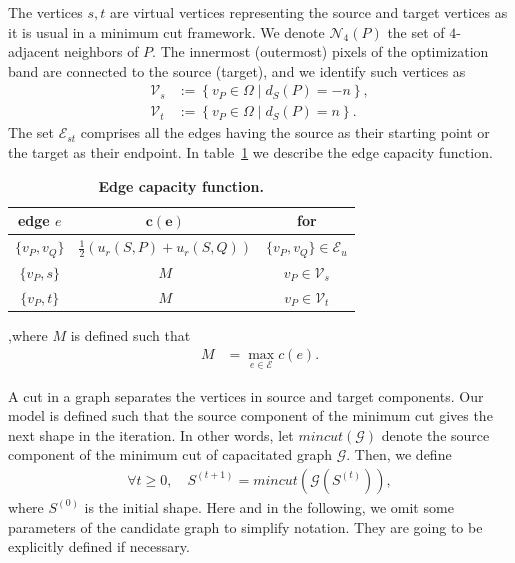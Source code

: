 \documentclass[smallextended]{svjour3}
\begin{document}
The vertices $s,t$ are virtual vertices representing the source and target vertices as it is usual in a minimum cut framework. We denote $\mathcal{N}_4(P)$ the set of $4$-adjacent neighbors of $P$. The innermost (outermost) pixels of the optimization band are connected to the source (target), and we identify such vertices as
%
%
\begin{align*}
	\mathcal{V}_s &:=\left\{ v_P \in \Omega \; | \; d_{S}(P) = -n \right\}, \\
	\mathcal{V}_t &:=\left\{ v_P \in \Omega \; | \; d_{S}(P) = n \right\}.
\end{align*}
%
%
The set $\mathcal{E}_{st}$ comprises all the edges having the source as their starting point or the target as their endpoint. In table~\ref{tab:edge-capacity} we describe the edge capacity function.
%
%
\begin{table}
\begin{center}
\begin{tabular}{|c|c|c|}
\hline
\textbf{edge} $e$ & $\mathbf{c(e)}$ & \textbf{for}\\
\hline
$\{v_P, v_Q\}$ & $ \frac{1}{2}\left( u_r(S,P) + u_r(S,Q) \right) $ & $\{v_P,v_Q\} \in \mathcal{E}_{u}$\\
\hline
$\{v_P, s\}$ & $M$ & $v_P \in \mathcal{V}_{s}$ \\
\hline
$\{v_P, t\}$ & $M$ & $v_P \in \mathcal{V}_{t}$ \\
\hline
\end{tabular}
\end{center}
,where $M$ is defined such that
\begin{align*}
	M &= \max_{e \in \mathcal{E} }{ c(e) }.
\end{align*}
\caption{\textbf{Edge capacity function.}}
\label{tab:edge-capacity}
\end{table}
%
%

A cut in a graph separates the vertices in source and target components. Our model is defined such that the source component of the minimum cut gives the next shape in the iteration. In other words, let $mincut(\mathcal{G})$ denote the source component of the minimum cut of capacitated graph $\mathcal{G}$. Then, we define
%
%
\begin{align}
	\forall t \geq0, \quad S^{(t+1)} = mincut\left( \mathcal{G}(S^{(t)}) \right), 
	\label{eq:no-neighborhood-process}
\end{align}
%
%
where $S^{(0)}$ is the initial shape. Here and in the following, we omit some parameters of the candidate graph to simplify notation. They are going to be explicitly defined if necessary.
\end{document}
